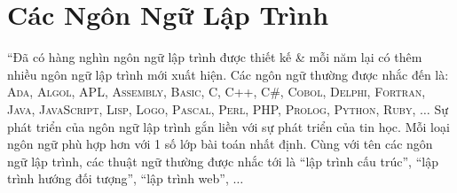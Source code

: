 \documentclass[oneside]{book}
\numberwithin{equation}{section}
\begin{document}

\section{Các Ngôn Ngữ Lập Trình}
``Đã có hàng nghìn ngôn ngữ lập trình được thiết kế \& mỗi năm lại có thêm nhiều ngôn ngữ lập trình mới xuất hiện. Các ngôn ngữ thường được nhắc đến là: \textsc{Ada, Algol, APL, Assembly, Basic, C, C++, C\#, Cobol, Delphi, Fortran, Java, JavaScript, Lisp, Logo, Pascal, Perl, PHP, Prolog, Python, Ruby}, $\ldots$ Sự phát triển của ngôn ngữ lập trình gắn liền với sự phát triển của tin học. Mỗi loại ngôn ngữ phù hợp hơn với 1 số lớp bài toán nhất định. Cùng với tên các ngôn ngữ lập trình, các thuật ngữ thường được nhắc tới là ``lập trình cấu trúc'', ``lập trình hướng đối tượng'', ``lập trình web'', $\ldots$
\end{document}
